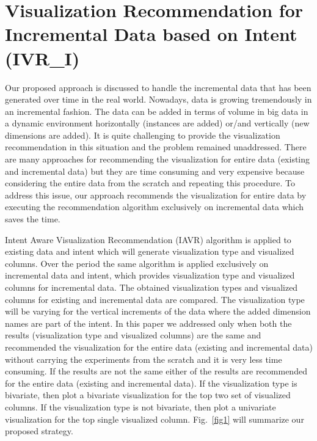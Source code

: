 \chapter{\Large Visualization Recommendation for Incremental Data based on Intent (IVR\_I)}


Our proposed approach is discussed to handle the incremental data that has been generated over time in the real world. Nowadays, data is growing tremendously in an incremental fashion. The data can be added in terms of volume in big data in a dynamic environment horizontally (instances are added) or/and vertically (new dimensions are added). It is quite challenging to provide the visualization recommendation in this situation and the problem remained unaddressed. There are many approaches for recommending the visualization for entire data (existing and incremental data) but they are time consuming and very expensive because considering the entire data from the scratch and repeating this procedure. To address this issue, our approach recommends the visualization for entire data by executing the recommendation algorithm exclusively on incremental data which saves the time. 

Intent Aware Visualization Recommendation (IAVR) algorithm \cite{maruta2021intent} is applied to existing data and intent which will generate visualization type and visualized columns. Over the period the same algorithm \cite{maruta2021intent} is applied exclusively on incremental data and intent, which provides visualization type and visualized columns for incremental data. The obtained visualization types and visualized columns for existing and incremental data are compared. The visualization type will be varying for the vertical increments of the data where the added dimension names are part of the intent. In this paper we addressed only when both the results (visualization type and visualized columns) are the same and recommended the visualization for the entire data (existing and incremental data) without carrying the experiments from the scratch and it is very less time consuming. If the results are not the same either of the results are recommended for the entire data (existing and incremental data). If the visualization type is bivariate, then plot a bivariate visualization for the top two set of visualized columns. If the visualization type is not bivariate, then plot a univariate visualization for the top single visualized column. Fig.~\ref{fig1} will summarize our proposed strategy.



